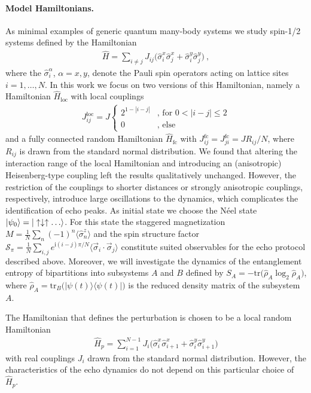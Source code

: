 \documentclass[%
 reprint,
unsortedaddress,
 amsmath,amssymb,
 prl,
]{revtex4-1}
\newcommand{\im}{\mathrm{i}}
\begin{document}
\paragraph{Model Hamiltonians.}
As minimal examples of generic quantum many-body systems we study spin-1/2
systems defined by the Hamiltonian
\begin{align}
	\hat H=\sum_{i\neq j}J_{ij}\big(\hat \sigma_i^x\hat \sigma_{j}^x+\hat \sigma_i^y\hat \sigma_{j}^y\big)\ ,
\end{align}
where the $\hat \sigma_i^\alpha$, $\alpha=x,y$, denote the Pauli spin operators acting on 
lattice sites $i=1,\ldots,N$.
In this work we focus on two versions of this Hamiltonian, namely a Hamiltonian 
$\hat H_\text{loc}$ with local couplings 
\begin{align}
	J_{ij}^{\text{loc}}=J\left\{\begin{array}{ll}
	2^{1-|i-j|}&\text{, for }0<|i-j|\leq2\\
	0&\text{, else}
	\end{array}\right.
\end{align}
and a fully connected random Hamiltonian $\hat H_\text{fc}$ with 
$J_{ij}^{\text{fc}}=J_{ji}^{\text{fc}}=JR_{ij}/N$, where $R_{ij}$ is 
drawn from the standard normal distribution. We found that altering the interaction range of the local
Hamiltonian and introducing an (anisotropic) Heisenberg-type coupling left the results qualitatively
unchanged. However, the restriction of the couplings to shorter distances or 
strongly anisotropic couplings, respectively,
introduce large oscillations to the dynamics, which complicates the identification of echo peaks.
As initial state we choose the N\'eel state
$\ket{\psi_0\rangle=|\uparrow\downarrow\uparrow\ldots}$. For this state the staggered magnetization
$M=\frac{1}{N}\sum_n(-1)^n\langle\hat\sigma_n^z\rangle$ and the spin structure factor 
$\mathcal S_\pi=\frac{1}{N}\sum_{i,j}e^{\im (i-j)\pi/N}\langle\vec \sigma_i\cdot\vec \sigma_j\rangle$ 
constitute suited observables for the echo protocol described above. Moreover, we will investigate
the dynamics of the entanglement entropy of bipartitions into subsystems $A$ and $B$ defined by
$S_A=-\text{tr}\big(\hat\rho_A\log_2\hat\rho_A\big)$,
where $\hat \rho_A=\text{tr}_B\big(|\psi(t)\rangle\langle\psi(t)|\big)$ is the reduced density matrix of the subsystem $A$.

The Hamiltonian that defines the perturbation is chosen to be a local random Hamiltonian
\begin{align}
	\hat H_p=\sum_{i=1}^{N-1}J_{i}\big(\hat \sigma_i^x\hat \sigma_{i+1}^x+\hat \sigma_i^y\hat \sigma_{i+1}^y\big)
	\label{eq:pertham}
\end{align}
with real couplings $J_{i}$ drawn from the standard normal distribution.
However, the characteristics of the echo dynamics do not depend on this particular choice of $\hat H_p$.
\end{document}
